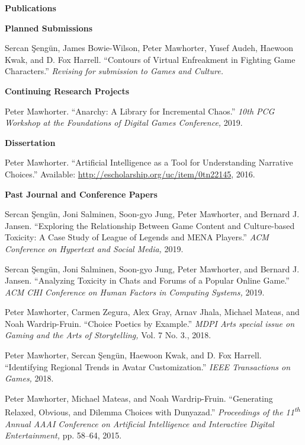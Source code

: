\documentclass[11pt]{article}
\newenvironment{pubs}[1]{%
  \vspace{8pt}\textbf{\Large #1} \hrulefill\vspace{6pt}
  \begin{adjustwidth}{14pt}{0pt}
  \setlength{\parskip}{4pt}
  \setlength{\parindent}{-8pt}
}{%
  \end{adjustwidth}
}
\newcommand{\pub}[3]{%
\begin{samepage}
#1. ``#2.'' \textit{#3.}

\end{samepage}%
}
\newcommand{\plainpub}[4]{%
\begin{samepage}
#1. ``#2.'' #3, #4.

\end{samepage}%
}
\newcommand{\fullpub}[5]{%
\begin{samepage}
#1. ``#2.'' \textit{#3,} #4, #5.

\end{samepage}%
}
\newcommand{\nppub}[4]{%
\begin{samepage}
#1. ``#2.'' \textit{#3,} #4.

\end{samepage}%
}
\newcommand{\heading}[1]{\textbf{\large #1}\vspace{4pt}}
\newcommand{\tsup}[1]{\textsuperscript{#1}}
\begin{document}
\begin{pubs}{Publications}

\hspace{-8pt}\heading{Planned Submissions}

  \pub{Sercan \c{S}eng\"un, James Bowie-Wilson, Peter Mawhorter, Yusef Audeh, Haewoon Kwak, and D. Fox Harrell}{Contours of Virtual Enfreakment in Fighting Game Characters}{Revising for submission to Games and Culture}

\vspace{6pt}
\heading{Continuing Research Projects}

\nppub{Peter Mawhorter}{Anarchy: A Library for Incremental Chaos}{10th PCG Workshop at the Foundations of Digital Games Conference}{2019}

\vspace{6pt}
\heading{Dissertation}

\plainpub{Peter Mawhorter}{Artificial Intelligence as a Tool for Understanding Narrative Choices}{\hfill\break Available: \url{http://escholarship.org/uc/item/0tn22145}}{2016}

\vspace{6pt}
\heading{Past Journal and Conference Papers}

  \nppub{Sercan \c{S}eng\"un, Joni Salminen, Soon-gyo Jung, Peter Mawhorter, and Bernard J. Jansen}{Exploring the Relationship Between Game Content and Culture-based Toxicity: A Case Study of League of Legends and MENA Players}{ACM Conference on Hypertext and Social Media}{2019}

  \nppub{Sercan \c{S}eng\"un, Joni Salminen, Soon-gyo Jung, Peter Mawhorter, and Bernard J. Jansen}{Analyzing Toxicity in Chats and Forums of a Popular Online Game}{ACM CHI Conference on Human Factors in Computing Systems}{2019}

  \fullpub{Peter Mawhorter, Carmen Zegura, Alex Gray, Arnav Jhala, Michael Mateas, and Noah Wardrip-Fruin}{Choice Poetics by Example}{MDPI Arts special issue on Gaming and the Arts of Storytelling}{Vol. 7 No. 3.}{2018}

  \nppub{Peter Mawhorter, Sercan \c{S}eng\"un, Haewoon Kwak, and D. Fox Harrell}{Identifying Regional Trends in Avatar Customization}{IEEE Transactions on Games}{2018}

\fullpub{Peter Mawhorter, Michael Mateas, and Noah Wardrip-Fruin}{Generating Relaxed, Obvious, and Dilemma Choices with Dunyazad}{Proceedings of the 11\tsup{th} Annual AAAI Conference on Artificial Intelligence and Interactive Digital Entertainment}{pp. 58--64}{2015}


\end{pubs}
\end{document}
